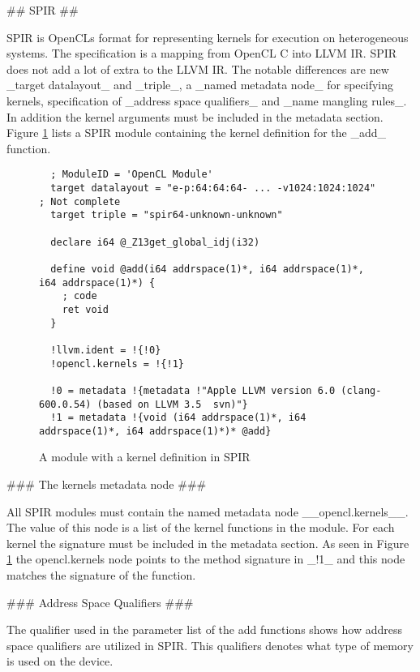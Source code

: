 \begin{markdown}
## SPIR ##

\gls{SPIR} is \glspl{OpenCL} format for representing kernels for
execution on heterogeneous systems. The specification is a mapping
from OpenCL C into LLVM IR. SPIR does not add a lot of extra to the
LLVM IR. The notable differences are new _target datalayout_ and
_triple_, a _named metadata node_ for specifying kernels,
specification of _address space qualifiers_ and _name mangling
rules_. In addition the kernel arguments must be included in the
metadata section. Figure \ref{fig:spir} lists a \gls{SPIR} module
containing the kernel definition for the _add_ function.


\begin{figure}[H]
  \begin{verbatim}
  ; ModuleID = 'OpenCL Module'
  target datalayout = "e-p:64:64:64- ... -v1024:1024:1024" ; Not complete
  target triple = "spir64-unknown-unknown"
  
  declare i64 @_Z13get_global_idj(i32)
  
  define void @add(i64 addrspace(1)*, i64 addrspace(1)*, i64 addrspace(1)*) {
    ; code
    ret void
  }
  
  !llvm.ident = !{!0}
  !opencl.kernels = !{!1}
  
  !0 = metadata !{metadata !"Apple LLVM version 6.0 (clang-600.0.54) (based on LLVM 3.5  svn)"}
  !1 = metadata !{void (i64 addrspace(1)*, i64 addrspace(1)*, i64 addrspace(1)*)* @add}
  \end{verbatim}
  \caption{A module with a kernel definition in SPIR}
  \label{fig:spir}
\end{figure}

### The kernels metadata node ###

All SPIR modules must contain the named metadata node
__opencl.kernels__. The value of this node is a list of the kernel
functions in the module. For each kernel the signature must be
included in the metadata section. As seen in Figure \ref{fig:spir} the
opencl.kernels node points to the method signature in _!1_ and this
node matches the signature of the function.

### Address Space Qualifiers ###

The qualifier used in the parameter list of the add functions shows
how address space qualifiers are utilized in SPIR. This qualifiers
denotes what type of memory is used on the device.


\end{markdown}
